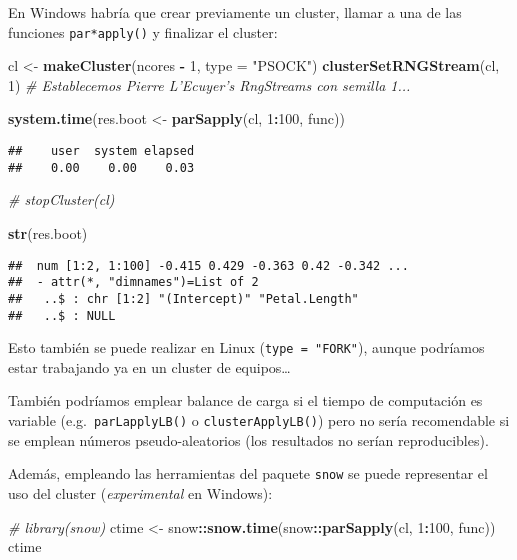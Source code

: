 \documentclass[
]{book}
\newenvironment{Shaded}{\begin{snugshade}}{\end{snugshade}}
\newcommand{\CommentTok}[1]{\textcolor[rgb]{0.56,0.35,0.01}{\textit{#1}}}
\newcommand{\DataTypeTok}[1]{\textcolor[rgb]{0.13,0.29,0.53}{#1}}
\newcommand{\DecValTok}[1]{\textcolor[rgb]{0.00,0.00,0.81}{#1}}
\newcommand{\KeywordTok}[1]{\textcolor[rgb]{0.13,0.29,0.53}{\textbf{#1}}}
\newcommand{\NormalTok}[1]{#1}
\newcommand{\OperatorTok}[1]{\textcolor[rgb]{0.81,0.36,0.00}{\textbf{#1}}}
\newcommand{\StringTok}[1]{\textcolor[rgb]{0.31,0.60,0.02}{#1}}
\theoremstyle{definition}
\theoremstyle{definition}
\theoremstyle{definition}
\theoremstyle{remark}
\begin{document}
En Windows habría que crear previamente un cluster, llamar a una de las funciones
\texttt{par*apply()} y finalizar el cluster:

\begin{Shaded}
\begin{Highlighting}[]
\NormalTok{cl <-}\StringTok{ }\KeywordTok{makeCluster}\NormalTok{(ncores }\OperatorTok{-}\StringTok{ }\DecValTok{1}\NormalTok{, }\DataTypeTok{type =} \StringTok{"PSOCK"}\NormalTok{)}
\KeywordTok{clusterSetRNGStream}\NormalTok{(cl, }\DecValTok{1}\NormalTok{) }\CommentTok{# Establecemos Pierre L'Ecuyer's RngStreams con semilla 1...}

\KeywordTok{system.time}\NormalTok{(res.boot <-}\StringTok{ }\KeywordTok{parSapply}\NormalTok{(cl, }\DecValTok{1}\OperatorTok{:}\DecValTok{100}\NormalTok{, func))}
\end{Highlighting}
\end{Shaded}

\begin{verbatim}
##    user  system elapsed 
##    0.00    0.00    0.03
\end{verbatim}

\begin{Shaded}
\begin{Highlighting}[]
\CommentTok{# stopCluster(cl)}

\KeywordTok{str}\NormalTok{(res.boot)}
\end{Highlighting}
\end{Shaded}

\begin{verbatim}
##  num [1:2, 1:100] -0.415 0.429 -0.363 0.42 -0.342 ...
##  - attr(*, "dimnames")=List of 2
##   ..$ : chr [1:2] "(Intercept)" "Petal.Length"
##   ..$ : NULL
\end{verbatim}

Esto también se puede realizar en Linux (\texttt{type\ =\ "FORK"}),
aunque podríamos estar trabajando ya en un cluster de equipos\ldots{}

También podríamos emplear balance de carga si el tiempo de computación es variable
(e.g.~\texttt{parLapplyLB()} o \texttt{clusterApplyLB()}) pero no sería recomendable si se emplean
números pseudo-aleatorios (los resultados no serían reproducibles).

Además, empleando las herramientas del paquete \texttt{snow} se puede representar el uso
del cluster (\emph{experimental} en Windows):

\begin{Shaded}
\begin{Highlighting}[]
\CommentTok{# library(snow)}
\NormalTok{ctime <-}\StringTok{ }\NormalTok{snow}\OperatorTok{::}\KeywordTok{snow.time}\NormalTok{(snow}\OperatorTok{::}\KeywordTok{parSapply}\NormalTok{(cl, }\DecValTok{1}\OperatorTok{:}\DecValTok{100}\NormalTok{, func))}
\NormalTok{ctime}
\end{Highlighting}
\end{Shaded}
\end{document}
